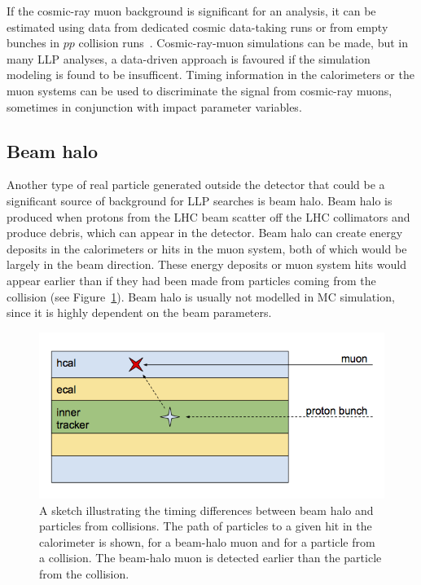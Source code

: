If the cosmic-ray muon background is significant for an analysis, it can be estimated using data from dedicated cosmic data-taking runs or from empty bunches in $pp$ collision runs~\cite{Khachatryan:2015jha, Chatrchyan:2012dxa, Khachatryan:2010uf}. Cosmic-ray-muon simulations can be made, but in many LLP analyses, a data-driven approach is favoured if the simulation modeling is found to be insufficent. Timing information in the calorimeters or the muon systems can be used to discriminate the signal from  cosmic-ray muons, sometimes in conjunction with impact parameter variables.

\subsection{Beam halo} %

Another type of real particle generated outside the detector that could be a significant source of background for LLP searches is beam halo. Beam halo is produced when protons from the LHC beam scatter off the LHC collimators and produce debris, which can appear in the detector. Beam halo can create energy deposits in the calorimeters or hits in the muon system, both of which would be largely in the beam direction. These energy deposits or muon system hits would appear earlier than if they had been made from particles coming from the collision (see Figure~\ref{fig:beamHaloSketch}). Beam halo is usually not modelled in MC simulation, since it is highly dependent on the beam parameters.

\begin{figure}[h]
  \centering
  \includegraphics[width=\textwidth]{figures/beamHaloSketch.png}
  \caption{A sketch illustrating the timing differences between beam halo and particles from collisions. The path of particles to a given hit in the calorimeter is shown, for a beam-halo muon and for a particle from a collision. The beam-halo muon is detected earlier than the particle from the collision.}
  \label{fig:beamHaloSketch}
\end{figure}

